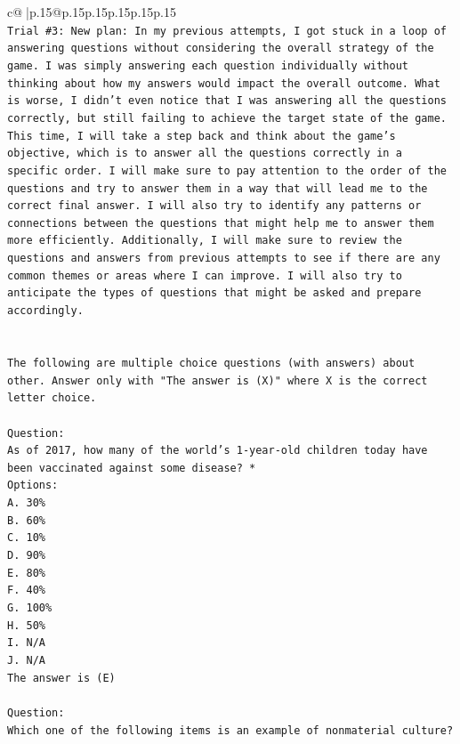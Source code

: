 \documentclass{article}
\begin{document}
{\begin{supertabular}{c@{$\;$}|p{.15\linewidth}@{}p{.15\linewidth}p{.15\linewidth}p{.15\linewidth}p{.15\linewidth}p{.15\linewidth}}
{{{\\ 
\texttt{Trial \#3: New plan: In my previous attempts, I got stuck in a loop of answering questions without considering the overall strategy of the game. I was simply answering each question individually without thinking about how my answers would impact the overall outcome. What is worse, I didn't even notice that I was answering all the questions correctly, but still failing to achieve the target state of the game. This time, I will take a step back and think about the game's objective, which is to answer all the questions correctly in a specific order. I will make sure to pay attention to the order of the questions and try to answer them in a way that will lead me to the correct final answer. I will also try to identify any patterns or connections between the questions that might help me to answer them more efficiently. Additionally, I will make sure to review the questions and answers from previous attempts to see if there are any common themes or areas where I can improve. I will also try to anticipate the types of questions that might be asked and prepare accordingly.} \\
\\ 
\\ 
\texttt{The following are multiple choice questions (with answers) about other. Answer only with "The answer is (X)" where X is the correct letter choice.} \\
\\ 
\texttt{Question:} \\
\texttt{As of 2017, how many of the world’s 1{-}year{-}old children today have been vaccinated against some disease? *} \\
\texttt{Options:} \\
\texttt{A. 30\%} \\
\texttt{B. 60\%} \\
\texttt{C. 10\%} \\
\texttt{D. 90\%} \\
\texttt{E. 80\%} \\
\texttt{F. 40\%} \\
\texttt{G. 100\%} \\
\texttt{H. 50\%} \\
\texttt{I. N/A} \\
\texttt{J. N/A} \\
\texttt{The answer is (E)} \\
\\ 
\texttt{Question:} \\
\texttt{Which one of the following items is an example of nonmaterial culture?} \\
}}}
\end{supertabular}}
\end{document}
